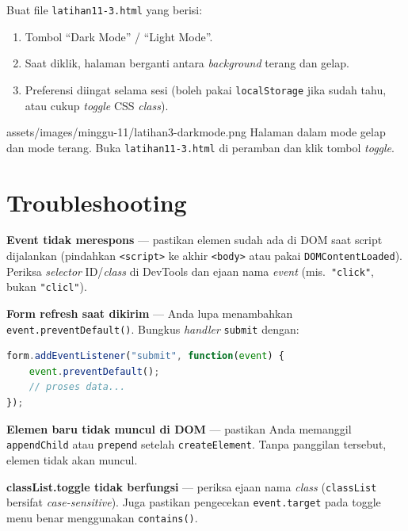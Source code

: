 \begin{latihan}
Buat file \texttt{latihan11-3.html} yang berisi:
\begin{enumerate}
  \item Tombol ``Dark Mode'' / ``Light Mode''.
  \item Saat diklik, halaman berganti antara \emph{background} terang dan gelap.
  \item Preferensi diingat selama sesi (boleh pakai \texttt{localStorage} jika sudah tahu, atau cukup \emph{toggle} CSS \emph{class}).
\end{enumerate}

\begin{tangkapanlayar}
  {assets/images/minggu-11/latihan3-darkmode.png}
  {Halaman dalam mode gelap dan mode terang.}
  {Buka \texttt{latihan11-3.html} di peramban dan klik tombol \emph{toggle}.}
\end{tangkapanlayar}
\end{latihan}

\section{Troubleshooting}
\label{sec:11-troubleshooting}

\begin{peringatan}
\textbf{Event tidak merespons} --- pastikan elemen sudah ada di DOM saat script dijalankan (pindahkan \texttt{<script>} ke akhir \texttt{<body>} atau pakai \texttt{DOMContentLoaded}). Periksa \emph{selector} ID/\emph{class} di DevTools dan ejaan nama \emph{event} (mis.\ \texttt{"click"}, bukan \texttt{"clicl"}).
\end{peringatan}

\begin{catatan}
\textbf{Form refresh saat dikirim} --- Anda lupa menambahkan \texttt{event.preventDefault()}. Bungkus \emph{handler} \texttt{submit} dengan:
\end{catatan}

\begin{lstlisting}[language=JavaScript, label={lst:11-prevent-default}]
form.addEventListener("submit", function(event) {
    event.preventDefault();
    // proses data...
});
\end{lstlisting}

\begin{catatan}
\textbf{Elemen baru tidak muncul di DOM} --- pastikan Anda memanggil \texttt{appendChild} atau \texttt{prepend} setelah \texttt{createElement}. Tanpa panggilan tersebut, elemen tidak akan muncul.
\end{catatan}

\begin{tip}
\textbf{classList.toggle tidak berfungsi} --- periksa ejaan nama \emph{class} (\texttt{classList} bersifat \emph{case-sensitive}). Juga pastikan pengecekan \texttt{event.target} pada toggle menu benar menggunakan \texttt{contains()}.
\end{tip}
